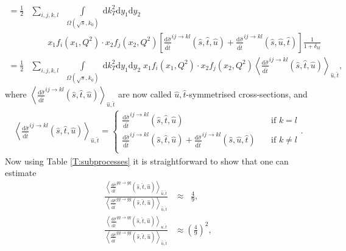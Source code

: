 \documentclass[a4paper, twoside, english, 12pt]{report}
\begin{document}
\begin{align}
= \frac{1}{2}&\sum_{i,j,k,l}\;\;\int\limits_{\Omega(\sqrt{s},k_0)}\;\text{d}k_T^2\text{d}y_1\text{d}y_2\;\nonumber\\[0.3em] &\qquad x_1f_i(x_1,Q^2)\cdot x_2f_j(x_2,Q^2) \left[\frac{\text{d}\hat{\sigma}}{\text{d}\hat{t}}^{ij\rightarrow kl}(\hat{s},\hat{t},\hat{u})+\frac{\text{d}\hat{\sigma}}{\text{d}\hat{t}}^{ij\rightarrow kl}(\hat{s},\hat{u},\hat{t})  \right]\frac{1}{1+\delta_{kl}}\nonumber\\[1.5em]
= \frac{1}{2}&\sum_{i,j,k,l}\;\;\int\limits_{\Omega(\sqrt{s},k_0)}\;\text{d}k_T^2\text{d}y_1\text{d}y_2\; x_1f_i(x_1,Q^2)\cdot x_2f_j(x_2,Q^2) \left\langle\frac{\text{d}\hat{\sigma}}{\text{d}\hat{t}}^{ij\rightarrow kl}(\hat{s},\hat{t},\hat{u}) \right\rangle_{\hat{u},\hat{t}},\label{E:SES_vaihe2}
\end{align}
where $\left\langle\frac{\text{d}\hat{\sigma}}{\text{d}\hat{t}}^{ij\rightarrow kl}(\hat{s},\hat{t},\hat{u}) \right\rangle_{\hat{u},\hat{t}}$ are now called ${\hat{u},\hat{t}}$-symmetrised cross-sections, and
\begin{align}
	\left\langle\frac{\text{d}\hat{\sigma}}{\text{d}\hat{t}}^{ij\rightarrow kl}(\hat{s},\hat{t},\hat{u}) \right\rangle_{\hat{u},\hat{t}}=
	\begin{cases}
	\frac{\text{d}\hat{\sigma}}{\text{d}\hat{t}}^{ij\rightarrow kl}(\hat{s},\hat{t},\hat{u})       & \quad \text{if } k=l\\[0.5em]
	\frac{\text{d}\hat{\sigma}}{\text{d}\hat{t}}^{ij\rightarrow kl}(\hat{s},\hat{t},\hat{u}) +\frac{\text{d}\hat{\sigma}}{\text{d}\hat{t}}^{ij\rightarrow kl}(\hat{s},\hat{u},\hat{t})  & \quad \text{if } k\neq l\\
	\end{cases}.
\end{align}
Now using Table \ref{T:subprocesses} it is straightforward to show that one can estimate 
\begin{align}
	\frac{\left\langle\frac{\text{d}\hat{\sigma}}{\text{d}\hat{t}}^{gq\rightarrow gq}(\hat{s},\hat{t},\hat{u}) \right\rangle_{\hat{u},\hat{t}}}{\left\langle\frac{\text{d}\hat{\sigma}}{\text{d}\hat{t}}^{gg\rightarrow gg}(\hat{s},\hat{t},\hat{u}) \right\rangle_{\hat{u},\hat{t}}} &\approx \;\;\frac{4}{9}, \label{E:SES_approx1}\\[0.6em]
	\frac{\left\langle\frac{\text{d}\hat{\sigma}}{\text{d}\hat{t}}^{qq\rightarrow qq}(\hat{s},\hat{t},\hat{u}) \right\rangle_{\hat{u},\hat{t}}}{\left\langle\frac{\text{d}\hat{\sigma}}{\text{d}\hat{t}}^{gg\rightarrow gg}(\hat{s},\hat{t},\hat{u}) \right\rangle_{\hat{u},\hat{t}}} &\approx \left(\frac{4}{9}\right)^2,\label{E:SES_approx2}
\end{align}
\end{document}
